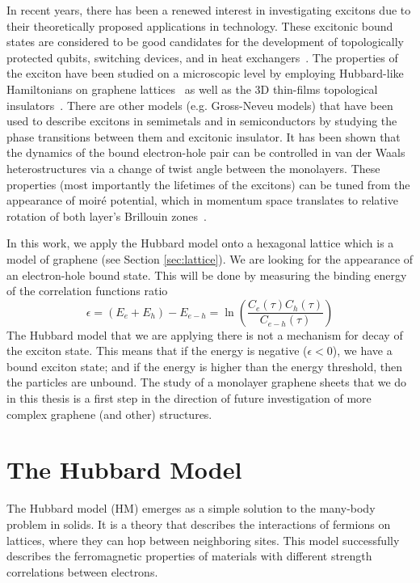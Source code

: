 In recent years, there has been a renewed interest in investigating excitons due to their theoretically proposed applications in technology. These excitonic bound states are considered to be good candidates for the development of topologically protected qubits, switching devices, and in heat exchangers~\cite{graphapl1, graphapl2, graphapl3}. The properties of the exciton have been studied on a microscopic level by employing Hubbard-like Hamiltonians on graphene lattices~\cite{graphene1, graphene2} as well as the 3D thin-films topological insulators~\cite{graphene3, graphene4, graphene5}. There are other models (e.g. Gross-Neveu models) that have been used to describe excitons in semimetals and in semiconductors by studying the phase transitions between them and excitonic insulator. It has been shown that the dynamics of the bound electron-hole pair can be controlled in van der Waals heterostructures via a change of twist angle between the monolayers. These properties (most importantly the lifetimes of the excitons) can be tuned from the appearance of moiré potential, which in momentum space translates to relative rotation of both layer's Brillouin zones~\cite{twistangle}.

In this work, we apply the Hubbard model onto a hexagonal lattice which is a model of graphene (see Section \ref{sec:lattice}). We are looking for the appearance of an electron-hole bound state. This will be done by measuring the binding energy of the correlation functions ratio
\begin{equation}
    \epsilon = (E_e + E_h) - E_{e-h} = \ln\left( \frac{C_e(\tau)C_h(\tau)}{C_{e-h}(\tau)} \right)
\end{equation}
The Hubbard model that we are applying there is not a mechanism for decay of the exciton state. This means that if the energy is negative ($\epsilon < 0$), we have a bound exciton state; and if the energy is higher than the energy threshold, then the particles are unbound. The study of a monolayer graphene sheets that we do in this thesis is a first step in the direction of future investigation of more complex graphene (and other) structures.

\section{The Hubbard Model}

The Hubbard model (HM) emerges as a simple solution to the many-body problem in solids. It is a theory that describes the interactions of fermions on lattices, where they can hop between neighboring sites. This model successfully describes the ferromagnetic properties of materials with different strength correlations between electrons. %

